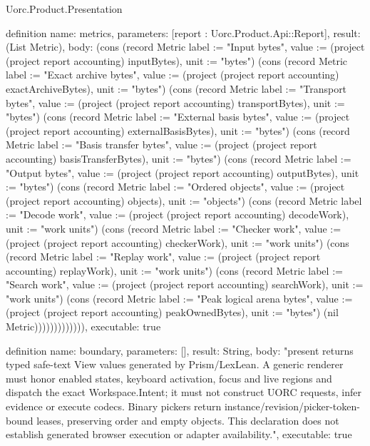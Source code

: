 \begin{lexlean}{Uorc.Product.Presentation}
\begin{semanticmodule}
definition{
  name: metrics,
  parameters: [report : Uorc.Product.Api::Report],
  result: (List Metric),
  body: (cons (record Metric {label := "Input bytes", value := (project (project report accounting) inputBytes), unit := "bytes"}) (cons (record Metric {label := "Exact archive bytes", value := (project (project report accounting) exactArchiveBytes), unit := "bytes"}) (cons (record Metric {label := "Transport bytes", value := (project (project report accounting) transportBytes), unit := "bytes"}) (cons (record Metric {label := "External basis bytes", value := (project (project report accounting) externalBasisBytes), unit := "bytes"}) (cons (record Metric {label := "Basis transfer bytes", value := (project (project report accounting) basisTransferBytes), unit := "bytes"}) (cons (record Metric {label := "Output bytes", value := (project (project report accounting) outputBytes), unit := "bytes"}) (cons (record Metric {label := "Ordered objects", value := (project (project report accounting) objects), unit := "objects"}) (cons (record Metric {label := "Decode work", value := (project (project report accounting) decodeWork), unit := "work units"}) (cons (record Metric {label := "Checker work", value := (project (project report accounting) checkerWork), unit := "work units"}) (cons (record Metric {label := "Replay work", value := (project (project report accounting) replayWork), unit := "work units"}) (cons (record Metric {label := "Search work", value := (project (project report accounting) searchWork), unit := "work units"}) (cons (record Metric {label := "Peak logical arena bytes", value := (project (project report accounting) peakOwnedBytes), unit := "bytes"}) (nil Metric))))))))))))),
  executable: true
}

definition{
  name: boundary,
  parameters: [],
  result: String,
  body: "present returns typed safe-text View values generated by Prism/LexLean. A generic renderer must honor enabled states, keyboard activation, focus and live regions and dispatch the exact Workspace.Intent; it must not construct UORC requests, infer evidence or execute codecs. Binary pickers return instance/revision/picker-token-bound leases, preserving order and empty objects. This declaration does not establish generated browser execution or adapter availability.",
  executable: true
}


\end{semanticmodule}
\end{lexlean}
